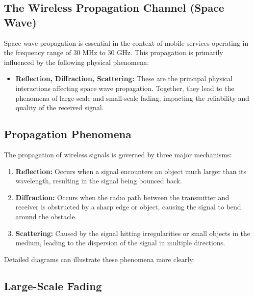 \subsection*{The Wireless Propagation Channel (Space Wave)}

Space wave propagation is essential in the context of mobile services operating in the frequency range of 30 MHz to 30 GHz. This propagation is primarily influenced by the following physical phenomena:

\begin{itemize}
    \item \textbf{Reflection, Diffraction, Scattering:} These are the principal physical interactions affecting space wave propagation. Together, they lead to the phenomena of large-scale and small-scale fading, impacting the reliability and quality of the received signal.
\end{itemize}



\subsection*{Propagation Phenomena}

The propagation of wireless signals is governed by three major mechanisms:

\begin{enumerate}
    \item \textbf{Reflection:} Occurs when a signal encounters an object much larger than its wavelength, resulting in the signal being bounced back.
    \item \textbf{Diffraction:} Occurs when the radio path between the transmitter and receiver is obstructed by a sharp edge or object, causing the signal to bend around the obstacle.
    \item \textbf{Scattering:} Caused by the signal hitting irregularities or small objects in the medium, leading to the dispersion of the signal in multiple directions.
\end{enumerate}

Detailed diagrams can illustrate these phenomena more clearly:




\subsection*{Large-Scale Fading}

